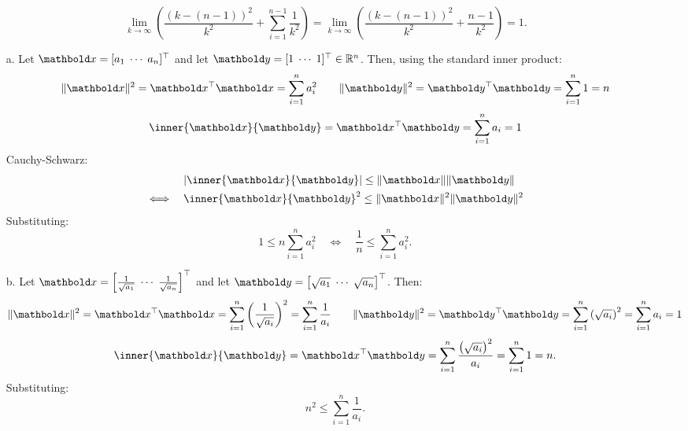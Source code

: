 \documentclass[11pt]{article}
\begin{document}
\begin{enumerate}
          \[
              \lim_{k \rightarrow \infty} \left( \frac{(k - (n - 1))^2}{k^2} + \sum_{i=1}^{n-1} \frac{1}{k^2} \right)
              = \lim_{k \rightarrow \infty} \left( \frac{(k - (n - 1))^2}{k^2} + \frac{n-1}{k^2} \right) = 1.
          \]

          \begin{enumerate}
              \item[a.] Let $\x = [ a_1 \; \cdots \; a_n ]^\top$ and let $\y = [ 1 \; \cdots \; 1 ]^\top \in \R^n$.
                    Then, using the standard inner product:
                    \[
                        \norm{\x}^2
                        = \x^\top \x
                        = \sum_{i = 1}^n a_i^2
                        \qquad
                        \norm{\y}^2
                        = \y^\top \y
                        = \sum_{i=1}^n 1 = n
                    \]
                    \[
                        \inner{\x}{\y}
                        = \x^\top \y
                        = \sum_{i=1}^n a_i = 1
                    \]
                    Cauchy-Schwarz:
                    \[
                        \begin{aligned}
                                       & \abs{\inner{\x}{\y}} \leq \norm{\x} \norm{\y} \\
                            \iff \quad & \inner{\x}{\y}^2 \leq \norm{\x}^2 \norm{\y}^2 \\
                        \end{aligned}
                    \]
                    Substituting:
                    \[
                        1 \leq n \sum_{i=1}^n a_i^2
                        \quad \iff \quad
                        \frac{1}{n} \leq \sum_{i=1}^n a_i^2.
                    \]

                    \pagebreak

              \item[b.] Let $\x = \left [ \frac{1}{\sqrt{a_1}} \; \cdots \; \frac{1}{\sqrt{a_n}} \right ]^\top$ and let
                    $\y = \left [ \sqrt{a_1} \; \cdots \; \sqrt{a_n} \right ]^\top$. Then:
                    \[
                        \norm{\x}^2
                        = \x^\top \x
                        = \sum_{i=1}^n \left ( \frac{1}{\sqrt{a_i}} \right )^2
                        = \sum_{i=1}^n \frac{1}{a_i}
                        \qquad
                        \norm{\y}^2
                        = \y^\top \y
                        = \sum_{i=1}^n \left ( \sqrt{a_i} \right )^2
                        = \sum_{i=1}^n a_i = 1
                    \]
                    \[
                        \inner{\x}{\y}
                        = \x^\top \y
                        = \sum_{i=1}^n \frac{\left ( \sqrt{a_i} \right )^2}{a_i} = \sum_{i=1}^n 1 = n.
                    \]
                    Substituting:
                    \[
                        n^2
                        \leq \sum_{i=1}^n \frac{1}{a_i}.
                    \]
          \end{enumerate}


\end{enumerate}
\end{document}
